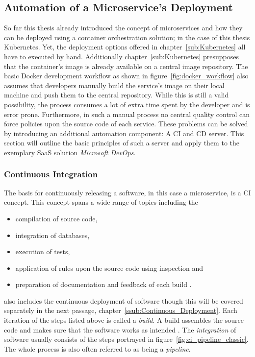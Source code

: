 
\subsection{Automation of a Microservice's Deployment}%
\label{sub:Automatic_a_Microservices_Deployment}
So far this thesis already introduced the concept of microservices and how they
can be deployed using a container orchestration solution; in the case of this
thesis Kubernetes. Yet, the deployment options offered in
chapter~\ref{sub:Kubernetes} all have to executed by hand. Additionally
chapter~\ref{sub:Kubernetes} presupposes that the container's image is already
available on a central image repository. The basic Docker development workflow
as shown in figure~\ref{fig:docker_workflow} also assumes that developers
manually build the service's image on their local machine and push them to the
central repository. While this is still a valid possibility, the process
consumes a lot of extra time spent by the developer and is error prone.
Furthermore, in such a manual process no central quality control can force
policies upon the source code of each service. These problems can be solved by
introducing an additional automation component: A \acf{CI} and \ac{CD} server.
This section will outline the basic principles of such a server and apply them
to the exemplary \ac{SaaS} solution \textit{Microsoft DevOps}.

\subsubsection{Continuous Integration}%
\label{ssub:Continuous_Integration}
The basis for continuously releasing a software, in this case a microservice,
is a \ac{CI} concept. This concept spans a wide range of topics including the
\begin{itemize}
  \item compilation of source code,
  \item integration of databases,
  \item execution of tests,
  \item application of rules upon the source code using inspection and
  \item preparation of documentation and feedback of each build \autocite[pp.
    12-20]{MatyasContinuousIntegration2007}.
\end{itemize}

\autocite{MatyasContinuousIntegration2007} also includes the continuous
deployment of software though this will be covered separately in the next
passage, chapter~\ref{ssub:Continuous_Deployment}. Each iteration of the steps
listed above is called a \textit{build}. A build assembles the source code and
makes sure that the software works as intended \autocite[p.
4]{MatyasContinuousIntegration2007}. The \textit{integration} of software
usually consists of the steps portrayed in
figure~\ref{fig:ci_pipeline_classic}. The whole process is also often referred
to as being a \textit{pipeline}.

